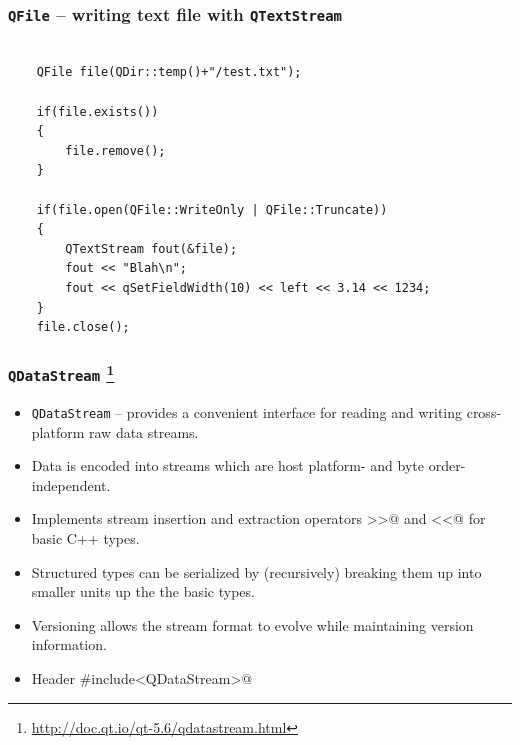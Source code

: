 \begin{frame}[fragile]
  \frametitle{\texttt{QFile} -- writing text file with \texttt{QTextStream}}
  \begin{lstlisting}

	QFile file(QDir::temp()+"/test.txt");

	if(file.exists())
	{
	    file.remove();
	}

	if(file.open(QFile::WriteOnly | QFile::Truncate))
	{
	    QTextStream fout(&file);
	    fout << "Blah\n";
	    fout << qSetFieldWidth(10) << left << 3.14 << 1234;
	}
	file.close();
  \end{lstlisting}
\end{frame}

\begin{frame}[fragile]
  \frametitle{\texttt{QDataStream}
    \footnote{\url{http://doc.qt.io/qt-5.6/qdatastream.html}}}
  \begin{itemize}
    \item \texttt{QDataStream} -- provides a convenient interface for reading
    and writing cross-platform raw data streams.
    \item Data is encoded into streams which are host platform- and byte
      order-independent.
    \item Implements stream insertion and extraction operators \verb@>>@ and \verb@<<@
      for basic C++ types.
    \item Structured types can be serialized by (recursively) breaking them up
      into smaller units up the the basic types.
    \item Versioning allows the stream format to evolve while maintaining
     version information.
    \item Header \verb@#include<QDataStream>@
  \end{itemize}
\end{frame}

